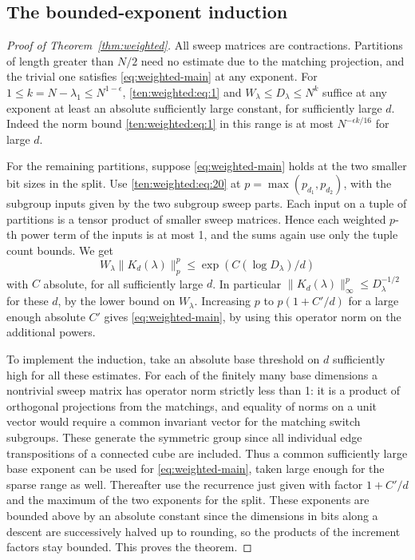 \subsection{The bounded-exponent induction}
\label{ten:weighted:part:271}
\begin{proof}[Proof of Theorem~\ref{thm:weighted}]
All sweep matrices are contractions. Partitions of length greater than \(N/2\) need no estimate due to the matching projection, and the trivial one satisfies \eqref{eq:weighted-main} at any exponent. For \(1\le k=N-\lambda_1\le N^{1-\epsilon}\), \eqref{ten:weighted:eq:1} and \(W_\lambda\le D_\lambda\le N^k\) suffice at any exponent at least an absolute sufficiently large constant, for sufficiently large \(d\). Indeed the norm bound \eqref{ten:weighted:eq:1} in this range is at most \(N^{-\epsilon k/16}\) for large \(d\).

For the remaining partitions, suppose \eqref{eq:weighted-main} holds at the two smaller bit sizes in the split. Use \eqref{ten:weighted:eq:20} at \(p=\max(p_{d_1},p_{d_2})\), with the subgroup inputs given by the two subgroup sweep parts. Each input on a tuple of partitions is a tensor product of smaller sweep matrices. Hence each weighted \(p\)-th power term of the inputs is at most 1, and the sums again use only the tuple count bounds. We get
\[
 W_\lambda \|K_d(\lambda)\|_p^p \le \exp(C (\log D_\lambda)/d)
\]
with \(C\) absolute, for all sufficiently large \(d\). In particular \(\|K_d(\lambda)\|_\infty^p\le D_\lambda^{-1/2}\) for these \(d\), by the lower bound on \(W_\lambda\). Increasing \(p\) to \(p(1+C'/d)\) for a large enough absolute \(C'\) gives \eqref{eq:weighted-main}, by using this operator norm on the additional powers.

To implement the induction, take an absolute base threshold on \(d\) sufficiently high for all these estimates. For each of the finitely many base dimensions a nontrivial sweep matrix has operator norm strictly less than 1: it is a product of orthogonal projections from the matchings, and equality of norms on a unit vector would require a common invariant vector for the matching switch subgroups. These generate the symmetric group since all individual edge transpositions of a connected cube are included. Thus a common sufficiently large base exponent can be used for \eqref{eq:weighted-main}, taken large enough for the sparse range as well. Thereafter use the recurrence just given with factor \(1+C'/d\) and the maximum of the two exponents for the split. These exponents are bounded above by an absolute constant since the dimensions in bits along a descent are successively halved up to rounding, so the products of the increment factors stay bounded. This proves the theorem.\end{proof}


